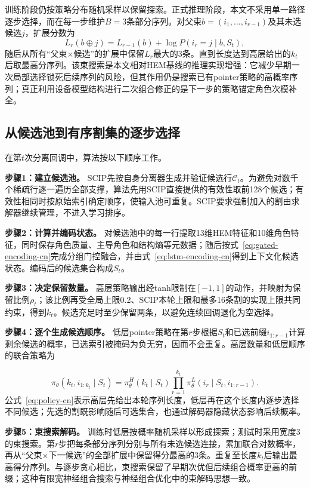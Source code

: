 \documentclass[final,5p,times,twocolumn]{elsarticle}
\begin{document}
训练阶段仍按策略分布随机采样以保留探索。正式推理阶段，本文不采用单一路径逐步选择，而在每一步维护$B=3$条部分序列。对父束$b=(i_1,\ldots,i_{r-1})$及其未选候选$j$，扩展分数为
\begin{equation}
L_r(b\oplus j)=L_{r-1}(b)+\log P(i_r=j\mid b,S_t),
\label{eq:beam-score-cn}
\end{equation}
随后从所有“父束$\times$候选”的扩展中保留$L_r$最大的3条。直到长度达到高层给出的$k_t$后取最高分序列。该束搜索是本文相对HEM基线的推理实现增强：它减少早期一次局部选择锁死后续序列的风险，但其作用仍是搜索已有pointer策略的高概率序列；真正利用设备模型结构进行二次组合修正的是下一步的策略锚定角色次模补全。

\subsection{从候选池到有序割集的逐步选择}

在第$t$次分离回调中，算法按以下顺序工作。

\noindent\textbf{步骤1：建立候选池。} SCIP先按自身分离器生成并验证候选行$\mathcal C_t$。为避免对数千个稀疏行逐一遍历全部支撑，算法先用SCIP直接提供的有效性取前128个候选；有效性相同时按原始索引确定顺序，使输入池可重复。SCIP要求强制加入的割由求解器继续管理，不进入学习排序。

\noindent\textbf{步骤2：计算并编码状态。} 对候选池中的每一行提取13维HEM特征和10维角色特征，同时保存角色质量、主导角色和结构熵等元数据；随后按式~\eqref{eq:gated-encoding-cn}完成分组门控融合，并由式~\eqref{eq:lstm-encoding-cn}得到上下文化候选状态。编码后的候选集合构成$S_t$。

\noindent\textbf{步骤3：决定保留数量。} 高层策略输出经tanh限制在$[-1,1]$的动作，并映射为保留比例$\rho_t$；该比例再受全局上限0.2、SCIP本轮上限和最多16条割的实现上限共同约束，得到$k_t$。候选充足时至少保留两条，以避免连续回调退化为空选择。

\noindent\textbf{步骤4：逐个生成候选顺序。} 低层pointer策略在第$r$步根据$S_t$和已选前缀$i_{1:r-1}$计算剩余候选的概率，已选索引被掩码为负无穷，因而不会重复。高层数量和低层顺序的联合策略为

\begin{equation}
\pi_\theta(k_t,i_{1:k_t}\mid S_t)=\pi_\theta^H(k_t\mid S_t)
\prod_{r=1}^{k_t}\pi_\theta^L(i_r\mid S_t,i_{1:r-1}).
\label{eq:policy-cn}
\end{equation}
公式~\eqref{eq:policy-cn}表示高层先给出本轮序列长度，低层再在这个长度内逐步选择不同候选；先选的割既影响随后可选集合，也通过解码器隐藏状态影响后续概率。

\noindent\textbf{步骤5：束搜索解码。} 训练时低层按概率随机采样以形成探索；测试时采用宽度3的束搜索。第$r$步把每条部分序列分别与所有未选候选连接，累加联合对数概率，再从“父束$\times$下一候选”的全部扩展中保留得分最高的3条。重复至长度$k_t$后输出最高得分序列。与逐步贪心相比，束搜索保留了早期次优但后续组合概率更高的前缀；这种有限宽神经组合搜索与神经组合优化中的束解码思想一致\citep{choo2022beam}。
\end{document}
